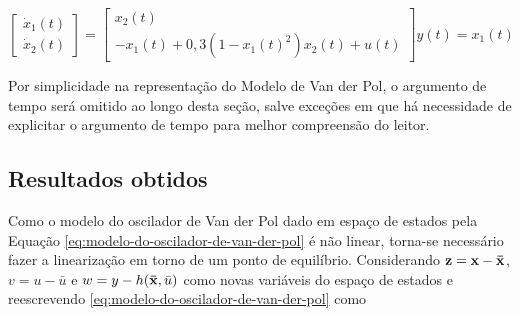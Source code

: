 \begin{subequations}
    \label{eq:modelo-do-oscilador-de-van-der-pol}
    \begin{equation}
        \begin{bmatrix}
            \dot{x}_1(t) \\
            \dot{x}_2(t)
        \end{bmatrix}
        =
        \begin{bmatrix}
            x_2(t) \\
            -x_1(t) + 0,3(1 - x_1(t)^2)x_2(t) + u(t)
        \end{bmatrix}
    \end{equation}
    \begin{equation}
        y(t) = x_1(t)
    \end{equation}
\end{subequations}

Por simplicidade na representação do Modelo de Van der Pol, o argumento de tempo
será omitido ao longo desta seção, salve exceções em que há necessidade de
explicitar o argumento de tempo para melhor compreensão do leitor.

\subsection{Resultados obtidos}

Como o modelo do oscilador de Van der Pol dado em espaço de estados pela Equação
\ref{eq:modelo-do-oscilador-de-van-der-pol} é não linear, torna-se necessário
fazer a linearização em torno de um ponto de equilíbrio. Considerando $\ssvec{z}
= \ssvec{x} - \ssveceq{x}$, $v = u - \bar{u}$ e $w = y - h(\ssveceq{x},
\bar{u})$ como novas variáveis do espaço de estados e reescrevendo
\ref{eq:modelo-do-oscilador-de-van-der-pol} como 

